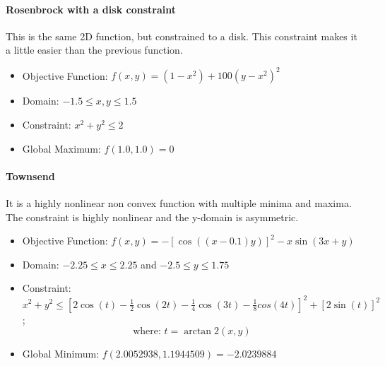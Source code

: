 
\paragraph{Rosenbrock with a disk constraint}
This is the same 2D function, but constrained to a disk. This constraint makes it a little easier than the previous function.
\begin{itemize}
	\item Objective Function: $f(x,y) = (1-x^2) + 100(y-x^2)^2$
	\item Domain: $-1.5 \leq x,y \leq 1.5$
	\item Constraint: $x^2 + y^2 \leq 2$
	\item Global Maximum: $f(1.0,1.0) = 0$
\end{itemize}

\paragraph{Townsend}
It is a highly nonlinear non convex function with multiple minima and maxima. The constraint is highly nonlinear and the y-domain is asymmetric.
\begin{itemize}
	\item Objective Function: $f(x,y) = -\left[\cos((x-0.1)y)\right]^2-x\sin(3x+y)$
	\item Domain: $-2.25 \leq x \leq 2.25$ and $-2.5 \leq y \leq 1.75$
	\item Constraint: $x^2 + y^2 \leq \left[2\cos(t)-\frac{1}{2}\cos(2t)-\frac{1}{4}\cos(3t) - \frac{1}{8}cos(4t) \right]^2+\left[2\sin(t)\right]^2 $;  \[ \text{where: } t=\arctan2(x,y) \]
	\item Global Minimum: $f(2.0052938,1.1944509) = -2.0239884$
\end{itemize}

